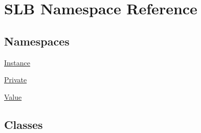 \hypertarget{namespaceSLB}{}\section{S\+LB Namespace Reference}
\label{namespaceSLB}
\subsection*{Namespaces}
\begin{DoxyCompactItemize}
\item 
 \hyperlink{namespaceSLB_1_1Instance}{Instance}
\item 
 \hyperlink{namespaceSLB_1_1Private}{Private}
\item 
 \hyperlink{namespaceSLB_1_1Value}{Value}
\end{DoxyCompactItemize}
\subsection*{Classes}
